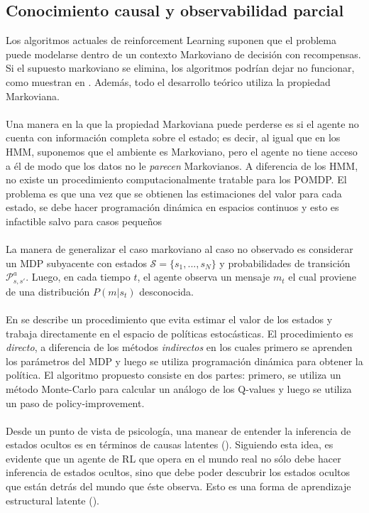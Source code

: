 \documentclass[11pt]{article}
\theoremstyle{plain}
\begin{document}
\subsection{Conocimiento causal y observabilidad parcial}
Los algoritmos actuales de reinforcement Learning suponen que el problema puede modelarse dentro de un contexto Markoviano de decisión con recompensas. Si el supuesto markoviano se elimina, los algoritmos podrían dejar no funcionar, como muestran en \cite{singh1994learning}. Además, todo el desarrollo teórico utiliza la propiedad Markoviana.\\
\\
Una manera en la que la propiedad Markoviana puede perderse es si el agente no cuenta con información completa sobre el estado; es decir, al igual que en los HMM, suponemos que el ambiente es Markoviano, pero el agente no tiene acceso a él de modo que los datos no le \textit{parecen} Markovianos. A diferencia de los HMM, no existe un procedimiento computacionalmente tratable para los POMDP. El problema es que una vez que se obtienen las estimaciones del valor para cada estado, se debe hacer programación dinámica en espacios continuos y esto es infactible salvo para casos pequeños\\
\\
La manera de generalizar el caso markoviano al caso no observado es considerar un MDP subyacente con estados $\mathcal{S}=\{ s_1,...,s_N\}$ y probabilidades de transición $\mathcal{P}^a_{s,s'}$. Luego, en cada tiempo $t$, el agente observa un mensaje $m_t$ el cual proviene de una distribución $P(m | s_t)$ desconocida.\\
\\
En \cite{jaakkola1995reinforcement} se describe un procedimiento que evita estimar el valor de los estados y trabaja directamente en el espacio de políticas estocásticas. El procedimiento es \textit{directo}, a diferencia de los métodos \textit{indirectos} en los cuales primero se aprenden los parámetros del MDP y luego se utiliza programación dinámica para obtener la política. El algoritmo propuesto consiste en dos partes: primero, se utiliza un método Monte-Carlo para calcular un análogo de los Q-values y luego se utiliza un paso de policy-improvement.\\
\\
Desde un punto de vista de psicología, una manear de entender la inferencia de estados ocultos es en términos de causas latentes (\cite{gershman2015reinforcement}). Siguiendo esta idea, es evidente que un agente de RL que opera en el mundo real no sólo debe hacer inferencia de estados ocultos, sino que debe poder descubrir los estados ocultos que están detrás del mundo que éste observa. Esto es una forma de aprendizaje estructural latente (\cite{gershman2010learning}).\\
\end{document}
